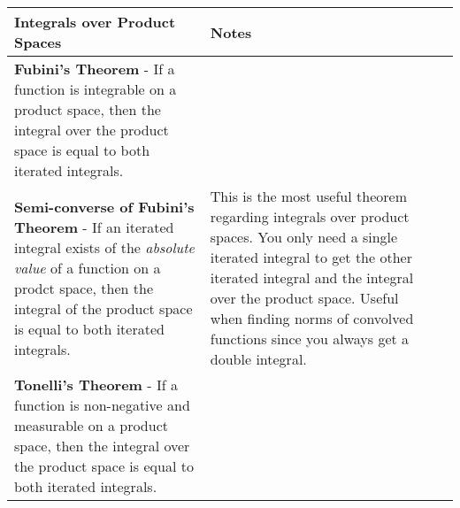 \begin{longtable}{|*{3}{>{\centering\arraybackslash}p{}|}}
    \toprule
        \textbf{Integrals over Product Spaces} & \textbf{Notes} \\[6pt]
        \midrule
        \endhead
            \textbf{Fubini's Theorem} - If a function is integrable on a product space, then the integral over the product space is equal to both iterated integrals.
            &
            \\[6pt] \hline
            
            \textbf{Semi-converse of Fubini's Theorem} - If an iterated integral exists of the \emph{absolute value} of a function on a prodct space, then the integral of the product space is equal to both iterated integrals.
            &
            This is the most useful theorem regarding integrals over product spaces.  You only need a single iterated integral to get the other iterated integral and the integral over the product space.  Useful when finding norms of convolved functions since you always get a double integral.
            \\[6pt] \hline
            
            \textbf{Tonelli's Theorem} - If a function is non-negative and measurable on a product space, then the integral over the product space is equal to both iterated integrals.
            &
            \\[6pt] \hline
    \bottomrule
\end{longtable}